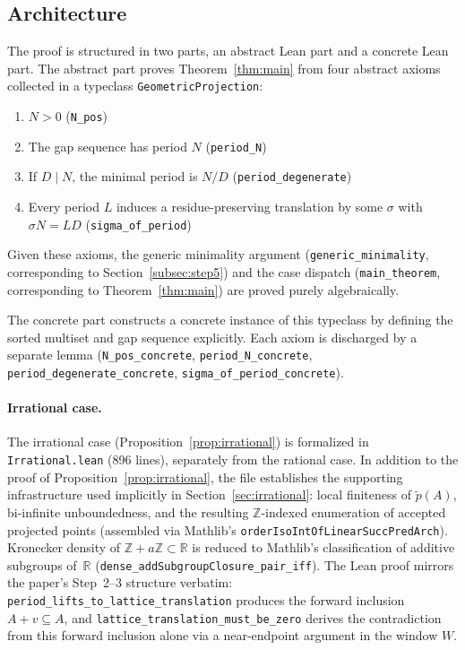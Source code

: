 \documentclass[11pt,reqno]{amsart}
\theoremstyle{plain}
\theoremstyle{definition}
\theoremstyle{remark}
\begin{document}
\subsection{Architecture}\label{subsec:lean_arch}

The proof is structured in two parts, an abstract Lean part and a
concrete Lean part.  The abstract part proves
Theorem~\ref{thm:main} from four abstract axioms collected in a
typeclass \texttt{GeometricProjection}:
\begin{enumerate}
    \item \(N > 0\) \hfill (\texttt{N\_pos})
    \item The gap sequence has period \(N\)
          \hfill (\texttt{period\_N})
    \item If \(D \mid N\), the minimal period is \(N/D\)
          \hfill (\texttt{period\_degenerate})
    \item Every period \(L\) induces a residue-preserving translation
          by some \(\sigma\) with \(\sigma N = LD\)
          \hfill (\texttt{sigma\_of\_period})
\end{enumerate}
Given these axioms, the generic minimality argument
(\texttt{generic\_minimality}, corresponding to
Section~\ref{subsec:step5}) and the case dispatch
(\texttt{main\_theorem}, corresponding to Theorem~\ref{thm:main})
are proved purely algebraically.

The concrete part constructs a concrete instance of this typeclass
by defining the sorted multiset and gap sequence explicitly.
Each axiom is discharged by a separate lemma
(\texttt{N\_pos\_concrete}, \texttt{period\_N\_concrete},
\texttt{period\_degenerate\_concrete},
\texttt{sigma\_of\_period\_concrete}).

\paragraph{Irrational case.}
The irrational case (Proposition~\ref{prop:irrational}) is formalized
in \texttt{Irrational.lean} (896 lines), separately from the rational
case.  In addition to
the proof of Proposition~\ref{prop:irrational}, the file establishes
the supporting infrastructure used implicitly in
Section~\ref{sec:irrational}: local finiteness of \(\tilde p(A)\),
bi-infinite unboundedness, and the resulting \(\mathbb{Z}\)-indexed
enumeration of accepted projected points (assembled via Mathlib's
\texttt{orderIsoIntOfLinearSuccPredArch}).  Kronecker density of
\(\mathbb{Z}+a\mathbb{Z}\subset\mathbb{R}\) is reduced to
Mathlib's classification of additive subgroups of~\(\mathbb{R}\)
(\texttt{dense\_addSubgroupClosure\_pair\_iff}).  The Lean proof
mirrors the paper's Step~2--3 structure verbatim:
\texttt{period\_lifts\_to\_lattice\_translation} produces the forward
inclusion \(A + v \subseteq A\), and
\texttt{lattice\_translation\_must\_be\_zero} derives the contradiction
from this forward inclusion alone via a near-endpoint argument in the
window \(W\).
\end{document}
